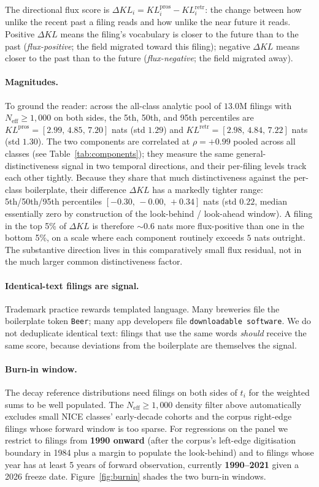 \documentclass[11pt]{article}
\begin{document}
The directional flux score is $\Delta KL_i = KL_i^{\text{pros}} -
KL_i^{\text{retr}}$: the change between how unlike the recent past a
filing reads and how unlike the near future it reads. Positive
$\Delta KL$ means the filing's vocabulary is closer to the future than
to the past (\emph{flux-positive}; the field migrated toward this
filing); negative $\Delta KL$ means closer to the past than to the
future (\emph{flux-negative}; the field migrated away).

\paragraph{Magnitudes.}
To ground the reader: across the all-class analytic pool of $13.0$M
filings with $N_{\text{eff}} \geq 1{,}000$ on both sides, the 5th,
50th, and 95th percentiles are
$KL^{\text{pros}} = [2.99,\, 4.85,\, 7.20]$ nats (std $1.29$) and
$KL^{\text{retr}} = [2.98,\, 4.84,\, 7.22]$ nats (std $1.30$). The two
components are correlated at $\rho = +0.99$ pooled across all classes
(see Table~\ref{tab:components}); they measure the same
general-distinctiveness signal in two temporal directions, and their
per-filing levels track each other tightly. Because they share that
much distinctiveness against the per-class boilerplate, their
difference $\Delta KL$ has a markedly tighter range: 5th/50th/95th
percentiles $[-0.30,\, -0.00,\, +0.34]$ nats (std $0.22$, median
essentially zero by construction of the look-behind / look-ahead
window). A filing in the top 5\% of $\Delta KL$ is therefore $\sim
0.6$ nats more flux-positive than one in the bottom 5\%, on a scale
where each component routinely exceeds $5$ nats outright. The
substantive direction lives in this comparatively small flux
residual, not in the much larger common distinctiveness factor.

\paragraph{Identical-text filings are signal.} Trademark practice rewards
templated language. Many breweries file the boilerplate token
\texttt{Beer}; many app developers file \texttt{downloadable software}.
We do not deduplicate identical text: filings that use the same words
\emph{should} receive the same score, because deviations from the
boilerplate are themselves the signal.

\paragraph{Burn-in window.}
The decay reference distributions need filings on both sides of $t_i$
for the weighted sums to be well populated. The $N_{\text{eff}} \geq
1{,}000$ density filter above automatically excludes small NICE
classes' early-decade cohorts and the corpus right-edge filings whose
forward window is too sparse. For regressions on the panel we restrict
to filings from \textbf{1990 onward} (after the corpus's left-edge
digitisation boundary in 1984 plus a margin to populate the
look-behind) and to filings whose year has at least 5 years of forward
observation, currently \textbf{1990--2021} given a 2026 freeze date.
Figure~\ref{fig:burnin} shades the two burn-in windows.
\end{document}
